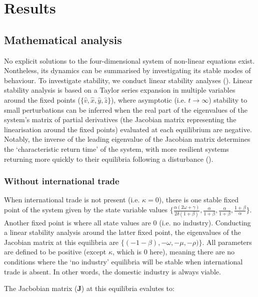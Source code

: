 \documentclass[12pt]{article}
\begin{document}
\section{Results}

\subsection{Mathematical analysis}
No explicit solutions to the four-dimensional system of non-linear equations exist. Nontheless, its dynamics can be summarised by investigating its stable modes of behaviour. To investigate stability, we conduct linear stability analyses (\cite{strogatz1994}). Linear stability analysis is based on a Taylor series expansion in multiple variables around the fixed points ($\{\hat{v}, \hat{x}, \hat{y}, \hat{z}\}$), where asymptotic (i.e. $t \rightarrow \infty$) stability to small perturbations can be inferred when the real part of the eigenvalues of the system's matrix of partial derivatives (the Jacobian matrix representing the linearisation around the fixed points) evaluated at each equilibrium are negative. Notably, the inverse of the leading eigenvalue of the Jacobian matrix determines the `characteristic return time' of the system, with more resilient systems returning more quickly to their equilibria following a disturbance (\cite{pimm1984}).

\subsubsection{Without international trade}
When international trade is not present (i.e. $\kappa = 0$), there is one stable fixed point of the system given by the state variable values $\big \{\frac{\alpha(2\omega + \gamma)}{2 \delta (1 + \beta)}, \frac{\alpha}{1 + \beta}, \frac{\alpha}{1 + \beta}, \frac{1 + \beta}{\alpha}\big\}$. Another fixed point is where all state values are 0 (i.e. no industry). Conducting a linear stability analysis around the latter fixed point, the eigenvalues of the Jacobian matrix at this equilibria are $\{(-1 - \beta), - \omega, - \mu, - \rho)\}$. All parameters are defined to be positive (except $\kappa$, which is $0$ here), meaning there are no conditions where the `no industry' equilibria will be stable when international trade is absent. In other words, the domestic industry is always viable.

\iffalse
The Jacbobian matrix ($\boldsymbol{J}$) at this equilibria evalutes to:
\end{document}
